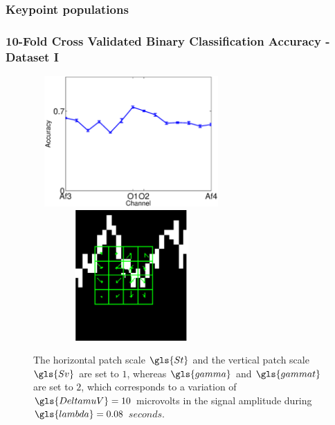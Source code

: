 \documentclass[aspectratio=169]{beamer}
\begin{document}
\begin{frame}   
\frametitle{Keypoint populations}
\begin{figure}[]
\centering
{}
\label{fig:digitalelectroencephalograph}
\end{figure}
\end{frame}


\begin{frame}
\frametitle{10-Fold Cross Validated Binary Classification Accuracy - Dataset I}
\begin{figure}[h!]
\centering
\includegraphics[width=7.5cm, height=5cm]{images/Dataset1AccuracyPerChannel}
\includegraphics[width=7.5cm, height=5cm]{images/AlphaWaveSampleEEG.png}
\caption{The horizontal patch scale $\gls{St}$ and the vertical patch scale $\gls{Sv}$ are set to $1$, whereas $\gls{gamma}$ and $\gls{gammat}$ are set to $2$, which corresponds to a variation of $\gls{DeltamuV} = 10$ microvolts in the signal amplitude during $\gls{lambda}=0.08$ $\si{seconds}$.}
\label{fig:alpharesultsdataseti}
\end{figure}
\end{frame}
\end{document}
